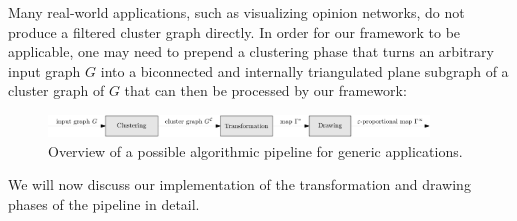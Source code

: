 Many real-world applications, such as visualizing opinion networks, do not produce a filtered cluster graph directly.
In order for our framework to be applicable, one may need to prepend a clustering phase that turns an arbitrary input graph $G$ into a biconnected and internally triangulated plane subgraph \clustergraph{} of a cluster graph of $G$ that can then be processed by our framework:
%
\begin{figure}[H]
	\centering\includegraphics[width=0.9\textwidth]{Resources/Framework-2.pdf}
	\caption{Overview of a possible algorithmic pipeline for generic applications.}
	\label{fig:static-pipeline-application}
\end{figure}

We will now discuss our implementation of the transformation and drawing phases of the pipeline in detail.

\clearpage


\clearpage

